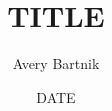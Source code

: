 \documentclass[12pt]{article}
\begin{document}
\title{TITLE}
\author{Avery Bartnik}
\date{DATE}
\maketitle
\end{document}
